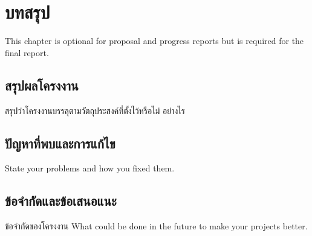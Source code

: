 \documentclass[12pt,oneside,openright,a4paper]{cpe-thai-project}
\begin{document}
\chapter{บทสรุป}

This chapter is optional for proposal and progress reports but 
is required for the final report.

\section{สรุปผลโครงงาน}
สรุปว่าโครงงานบรรลุตามวัตถุประสงค์ที่ตั้งไว้หรือไม่ อย่างไร 

\section{ปัญหาที่พบและการแก้ไข}
State your problems and how you fixed them.

\section{ข้อจำกัดและข้อเสนอแนะ}
ข้อจำกัดของโครงงาน What could be done in the future to make your projects better.



\makeatletter
\g@addto@macro{\UrlBreaks}{\UrlOrds}
\makeatother




 \\
\end{document}
